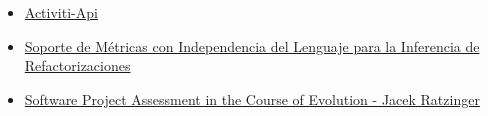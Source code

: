 
\begin{itemize}
	\item \href{https://github.com/dba0010/Activiti-Api}{Activiti-Api}
	\item \href{https://www.researchgate.net/profile/Yania_Crespo/publication/221595114_Soporte_de_Metricas_con_Independencia_del_Lenguaje_para_la_Inferencia_de_Refactorizaciones/links/09e4150b5f06425e32000000/Soporte-de-Metricas-con-Independencia-del-Lenguaje-para-la-Inferencia-de-Refactorizaciones.pdf}{Soporte de Métricas con Independencia del Lenguaje para la Inferencia de Refactorizaciones}
	\item \href{http://www.inf.usi.ch/jazayeri/docs/Thesis_Jacek_Ratzinger.pdf}{Software Project Assessment in the Course of Evolution -  Jacek Ratzinger}
\end{itemize}